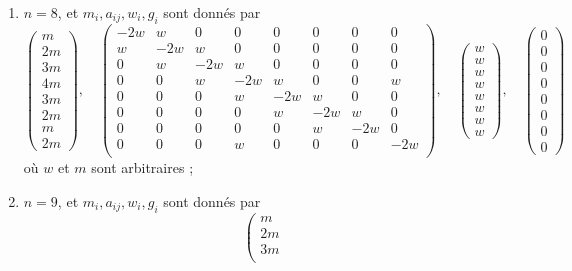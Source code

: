 \begin{lemma}[Genre un]
\begin{enumerate}
$$\right)
$$
où $w$ et $m$ sont arbitraires ;
\item
\label{item-E7-completed}
$n = 8$, et $m_i, a_{ij}, w_i, g_i$ sont donnés par
$$
\left(
\begin{matrix}
m \\
2m \\
3m \\
4m \\
3m \\
2m \\
m \\
2m
\end{matrix}
\right),
\quad
\left(
\begin{matrix}
-2w & w & 0 & 0 & 0 & 0 & 0 & 0 \\
w & -2w & w & 0 & 0 & 0 & 0 & 0 \\
0 & w & -2w & w & 0 & 0 & 0 & 0 \\
0 & 0 & w & -2w & w & 0 & 0 & w \\
0 & 0 & 0 & w & -2w & w & 0 & 0 \\
0 & 0 & 0 & 0 & w & -2w & w & 0 \\
0 & 0 & 0 & 0 & 0 & w & -2w & 0 \\
0 & 0 & 0 & w & 0 & 0 & 0 & -2w \\
\end{matrix}
\right),
\quad
\left(
\begin{matrix}
w \\
w \\
w \\
w \\
w \\
w \\
w \\
w
\end{matrix}
\right),
\quad
\left(
\begin{matrix}
0 \\
0 \\
0 \\
0 \\
0 \\
0 \\
0 \\
0
\end{matrix}
\right)
$$
où $w$ et $m$ sont arbitraires ;
\item
\label{item-E8-completed}
$n = 9$, et $m_i, a_{ij}, w_i, g_i$ sont donnés par
$$
\left(
\begin{matrix}
m \\
2m \\
3m \\

\end{matrix}$$
\end{enumerate}
\end{lemma}
